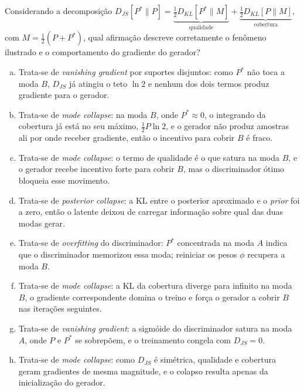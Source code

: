 \documentclass{dlproblemset}
\begin{document}
\begin{enumerate}[I)]
Considerando a decomposição $D_{JS}[P^{*}\|P] = \underbrace{\tfrac{1}{2}D_{KL}[P^{*}\|M]}_{\text{qualidade}} + \underbrace{\tfrac{1}{2}D_{KL}[P\|M]}_{\text{cobertura}}$, com $M = \tfrac{1}{2}(P + P^{*})$, qual afirmação descreve corretamente o fenômeno ilustrado e o comportamento do gradiente do gerador?
\begin{enumerate}[(a)]
    \item Trata-se de \textit{vanishing gradient} por suportes disjuntos: como $P^{*}$ não toca a moda $B$, $D_{JS}$ já atingiu o teto $\ln 2$ e nenhum dos dois termos produz gradiente para o gerador.
    \item Trata-se de \textit{mode collapse}: na moda $B$, onde $P^{*} \approx 0$, o integrando da cobertura já está no seu máximo, $\tfrac{1}{2}P\ln 2$, e o gerador não produz amostras ali por onde receber gradiente, então o incentivo para cobrir $B$ é fraco.
    \item Trata-se de \textit{mode collapse}: o termo de qualidade é o que satura na moda $B$, e o gerador recebe incentivo forte para cobrir $B$, mas o discriminador ótimo bloqueia esse movimento.
    \item Trata-se de \textit{posterior collapse}: a KL entre o posterior aproximado e o \textit{prior} foi a zero, então o latente deixou de carregar informação sobre qual das duas modas gerar.
    \item Trata-se de \textit{overfitting} do discriminador: $P^{*}$ concentrada na moda $A$ indica que o discriminador memorizou essa moda; reiniciar os pesos $\phi$ recupera a moda $B$.
    \item Trata-se de \textit{mode collapse}: a KL da cobertura diverge para infinito na moda $B$, o gradiente correspondente domina o treino e força o gerador a cobrir $B$ nas iterações seguintes.
    \item Trata-se de \textit{vanishing gradient}: a sigmóide do discriminador satura na moda $A$, onde $P$ e $P^{*}$ se sobrepõem, e o treinamento congela com $D_{JS} = 0$.
    \item Trata-se de \textit{mode collapse}: como $D_{JS}$ é simétrica, qualidade e cobertura geram gradientes de mesma magnitude, e o colapso resulta apenas da inicialização do gerador.
\end{enumerate}


\end{enumerate}
\end{document}
